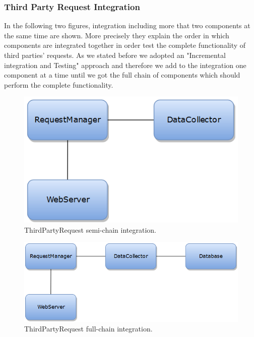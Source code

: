 \subsubsection{Third Party Request Integration}
In the following two figures, integration including more that two components at the same time are shown. More precisely they explain the order in which components are integrated together in order test the complete functionality of third parties' requests. As we stated before we adopted  an "Incremental integration and Testing" approach and therefore we add to the integration one component at a time until we got the full chain of components which should perform the complete functionality.
\begin{figure}[H]
\centering
\includegraphics[scale=0.7]{Images/IntegrationPlanImages/fig15.png}
\caption{ThirdPartyRequest semi-chain integration.}
\end{figure}

\begin{figure}[H]
\centering
\includegraphics[scale=0.7]{Images/IntegrationPlanImages/fig16.png}
\caption{ThirdPartyRequest full-chain integration.}
\end{figure}


